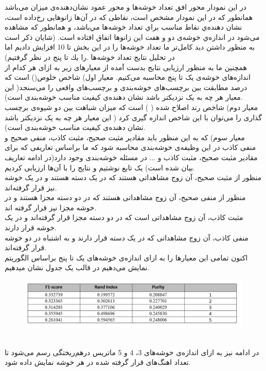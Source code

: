 \documentclass[10pt,onecolumn,a4paper]{article}
\begin{document}
در این نمودار محور افق تعداد خوشه‌ها و محور عمود   نشان‌دهنده‌ی میزان   می‌باشد همانطور که در این نمودار مشخص است، نقاطی که در آن‌ها زانو‌هایی رخ‌داده است،‌ نشان‌ دهنده‌ي نقاط مناسب براي تعداد خوشه‌ها مي‌باشد، و همانطور که مشاهده می‌شود در اندازه‌ي خوشه‌ی دو و هفت این زانو‌ها اتفاق افتاده است. (شايان ذكر است به منظور داشتن ديد كامل‌تر ما تعداد خوشه‌ها را در اين بخش تا 10 افزايش داديم اما در تحليل نتايج تعداد خوشه‌ها .را يك تا پنج در نظر گرفتیم)
\\
همچنین ما به منظور ارزیابی نتایج بدست آمده از معیارهای زیر به ازای هر کدام از اندازه‌های خوشه‌ی یک تا پنج محاسبه‌ می‌کنیم. 
معیار اول) شاخص خلوص() است که درصد مطابقت بین برچسب‌های خوشه‌بندی و برچسب‌های واقعی را می‌سنجد( این معیار هر چه به یک نزدیکتر باشد نشان دهنده‌ی کیفیت مناسب خوشه‌بندی است).
\\
معیار دوم) شاخص رند اصلاح شده (  ) است که میزان شباهت بین دو شیوه‌ی برچسب گذاری را می‌توان با این شاخص اندازه‌ گیری کرد ( این معیار هر چه به یک نزدیکتر باشد نشان دهنده‌ی کیفیت مناسب خوشه‌بندی است).
\\
معیار سوم)   که به این منظور باید مقادیر مثبت صحیح، مثبت کاذب، منفی صحیح و منفی کاذب در این وظیفه‌ی خوشه‌بندی محاسبه شود که ما براساس تعاریفی که برای مقادیر مثبت صحیح، مثبت کاذب و ... در مسئله خوشه‌بندی وجود دارد(در ادامه تعاریف بیان شده است) یک تابع نوشتیم و نتایج را با آن‌ها ارزیابی کردیم.
\\
منظور از مثبت صحیح، آن زوج مشاهداتی هستند که در یک دسته‌ هستند و در یک خوشه نیز قرار گرفته‌اند.
\\
منظور از منفی صحیح، آن زوج مشاهداتی هستند که در دو دسته مجزا هستند و در خوشه مجزا نیز قرار گرفته اند.
\\
مثبت کاذب، آن زوج مشاهداتی است که در دو دسته مجزا قرار گرفته‌اند و در یک خوشه قرار دارند.
\\
منفی کاذب، آن زوج مشاهداتی که در یک دسته‌ قرار دارند و به اشتباه در دو خوشه قرار گرفته‌اند.
\\
اکنون تمامی این معیارها را به ازای اندازه‌ی خوشه‌های یک تا پنج براساس الگوریتم   نمایش می‌دهیم در قالب یک جدول نشان میدهیم.
\\

\begin{figure}[h!]
        \centering
        \includegraphics[scale=0.45]{km2.png}
        
    \end{figure}
\\
در ادامه نیز به ازای اندازه‌ی خوشه‌های 3، 4 و 5 ماتریس درهم‌ریختگی رسم می‌شود تا تعداد اهنگ‌های قرار گرفته شده در هر خوشه نمایش داده شود.  
\\
\end{document}
